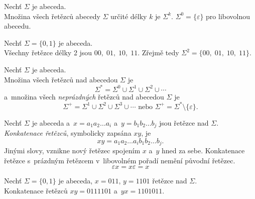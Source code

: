 \begin{definition}
    Nechť $\Sigma$ je abeceda.\\
    Množina všech řetězců abecedy $\Sigma$ určité délky $k$ je $\Sigma^k$.
    $\Sigma^0 = \{\varepsilon\}$ pro libovolnou abecedu.
\end{definition}

\begin{example}
    Nechť $\Sigma = \{0, 1\}$ je abeceda.\\
    Všechny řetězce délky 2 jsou $00,\; 01,\; 10,\; 11$.
    Zřejmě tedy $\Sigma^2 = \{00,\; 01,\; 10,\; 11\}$.
\end{example}

\begin{definition}
    Nechť $\Sigma$ je abeceda.\\
    Množina všech řetězců nad abecedou $\Sigma$ je
    \begin{equation*}
        \Sigma^* = \Sigma^0 \cup \Sigma^1 \cup \Sigma^2 \cup \cdots
    \end{equation*}
    a~množina všech \emph{neprázdných} řetězců nad abecedou $\Sigma$ je
    \begin{equation*}
        \Sigma^+ = \Sigma^1 \cup \Sigma^2 \cup \Sigma^3 \cup \cdots \text{ nebo } \Sigma^+ = \Sigma^* \setminus \{\varepsilon\}.
    \end{equation*}
\end{definition}

\begin{definition}
    Nechť $\Sigma$ je abeceda a~$x = a_1a_2\ldots a_i$ a~$y = b_1b_2\ldots b_j$ jsou řetězce nad $\Sigma$.\\
    \emph{Konkatenace řetězců}, symbolicky zapsána $xy$, je
    \begin{equation*}
        xy = a_1a_2\ldots a_ib_1b_2\ldots b_j.
    \end{equation*}
    Jinými slovy, vznikne nový řetězec spojením $x$ a~$y$ hned za sebe.
    Konkatenace řetězce s~prázdným řetězcem v~libovolném pořadí nemění původní řetězec.
    \begin{equation*}
        \varepsilon x = x\varepsilon = x
    \end{equation*}
\end{definition}

\begin{example}
    Nechť $\Sigma = \{0, 1\}$ je abeceda, $x = 011$, $y = 1101$ řetězce nad $\Sigma$.\\
    Konkatenace řetězců $xy = 0111101$ a~$yx = 1101011$.
\end{example}

